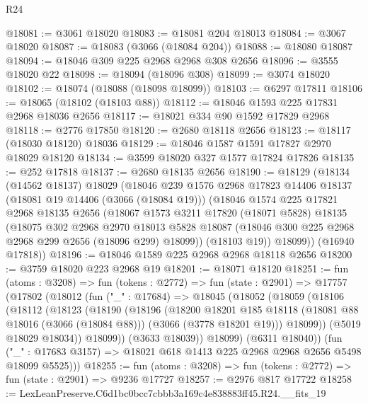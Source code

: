 \begin{lexlean}{R24}
\begin{coremodule}
@18081 := @3061 @18020
@18083 := @18081 @204 @18013
@18084 := @3067 @18020
@18087 := @18083 (@3066 (@18084 @204))
@18088 := @18080 @18087
@18094 := @18046 @309 @225 @2968 @2968 @308 @2656
@18096 := @3555 @18020 @22
@18098 := @18094 (@18096 @308)
@18099 := @3074 @18020
@18102 := @18074 (@18088 (@18098 @18099))
@18103 := @6297 @17811
@18106 := @18065 (@18102 (@18103 @88))
@18112 := @18046 @1593 @225 @17831 @2968 @18036 @2656
@18117 := @18021 @334 @90 @1592 @17829 @2968
@18118 := @2776 @17850
@18120 := @2680 @18118 @2656
@18123 := @18117 (@18030 @18120) @18036
@18129 := @18046 @1587 @1591 @17827 @2970 @18029 @18120
@18134 := @3599 @18020 @327 @1577 @17824 @17826
@18135 := @252 @17818
@18137 := @2680 @18135 @2656
@18190 := @18129
    (@18134
      (@14562 @18137)
      @18029
      (@18046
        @239
        @1576
        @2968
        @17823
        @14406
        @18137
        (@18081 @19 @14406 (@3066 (@18084 @19)))
        (@18046
          @1574
          @225
          @17821
          @2968
          @18135
          @2656
          (@18067
            @1573
            @3211
            @17820
            (@18071 @5828)
            @18135
            (@18075
              @302
              @2968
              @2970
              @18013
              @5828
              @18087
              (@18046 @300 @225 @2968 @2968 @299 @2656 (@18096 @299) @18099))
            (@18103 @19))
          @18099))
      (@16940 @17818))
@18196 := @18046 @1589 @225 @2968 @2968 @18118 @2656
@18200 := @3759 @18020 @223 @2968 @19
@18201 := @18071 @18120
@18251 := fun (atoms : @3208) =>
  fun (tokens : @2772) =>
  fun (state : @2901) =>
  @17757
    (@17802
      (@18012
        (fun ("_" : @17684) =>
        @18045
          (@18052
            (@18059
              (@18106
                (@18112
                  (@18123
                    (@18190
                      (@18196
                        (@18200
                          @18201
                          @185
                          @18118
                          (@18081 @88 @18016 (@3066 (@18084 @88)))
                          (@3066 (@3778 @18201 @19)))
                        @18099))
                    (@5019 @18029 @18034))
                  @18099))
              (@3633 @18039))
            @18099)
          (@6311 @18040))
        (fun ("_" : @17683 @3157) => @18021 @618 @1413 @225 @2968 @2968 @2656 @5498 @18099 @5525)))
@18255 := fun (atoms : @3208) => fun (tokens : @2772) => fun (state : @2901) => @9236 @17727
@18257 := @2976 @817 @17722
@18258 := LexLeanPreserve.C6d1bc0bcc7cbbb3a169c4e838883ff45.R24.__fits_19

\end{coremodule}
\end{lexlean}
